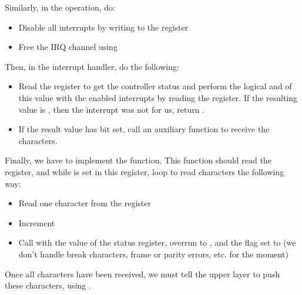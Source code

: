 Similarly, in the  operation, do:

\begin{itemize}

\item Disable all interrupts by writing  to the
   register

\item Free the IRQ channel using 

\end{itemize}

Then, in the interrupt handler, do the following:

\begin{itemize}

\item Read the  register to get the controller
  status and perform the logical and of this value with the enabled
  interrupts by reading the  register. If the
  resulting value is , then the interrupt was not for us, return
  .

\item If the result value has bit  set, call an
  auxiliary function  to receive the characters.

\end{itemize}

Finally, we have to implement the 
function. This function should read the 
register, and while  is set in this register,
loop to read characters the following way:

\begin{itemize}

\item Read one character from the  register

\item Increment 

\item Call  with the value of the status
  register, overrun to , and the flag set to
   (we don't handle break characters, frame or
  parity errors, etc. for the moment)

\end{itemize}

Once all characters have been received, we must tell the upper layer
to push these characters, using .

